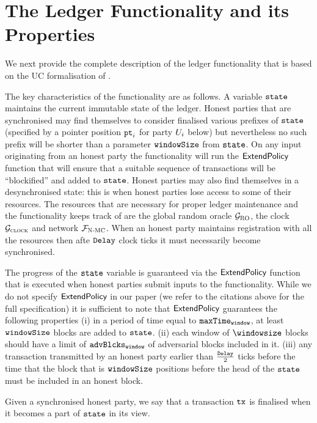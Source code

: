 




\section{The Ledger Functionality and its Properties} 
We next provide the complete description of the ledger functionality that is based on the UC formalisation of 
\cite{BMTZ17,genesis}. 

The key characteristics of the functionality are as follows. 
A variable $\texttt{state}$ maintains the current immutable state of the ledger. 
Honest parties that are synchronised may find themselves  to consider finalised 
various prefixes of $\texttt{state}$ (specified by a pointer position $\texttt{pt}_{i}$  for party
$U_i$ below) but nevertheless no such prefix will be shorter than a parameter
$\texttt{windowSize}$ from $\texttt{state}$. On any input originating from an honest party 
the functionality will run the $\textsf{ExtendPolicy}$ function that will ensure that
a suitable sequence of transactions will be ``blockified'' and added
to $\texttt{state}$. Honest parties may also find themselves in a desynchronised
state: this is when honest parties lose access to some of their resources.
The resources that are necessary for proper ledger maintenance 
and the functionality
keeps track of are the global random oracle $\mathcal{G}_{\textsc{RO}}$, the clock $\mathcal{G}_{\textsc{clock}}$
and network $\mathcal{F}_{\textsc{N-MC}}$. 
When an honest party maintains registration with all the resources
then afte $\texttt{Delay}$ clock ticks it must necessarily become synchronised. 

The progress of the $\texttt{state}$ variable is guaranteed via 
the $\textsf{ExtendPolicy}$ function that is executed when honest parties
submit inputs to the functionality. 
While we do not specify $\textsf{ExtendPolicy}$ in our paper
(we refer to the citations above for the full specification)
it is sufficient to note that $\textsf{ExtendPolicy}$ guarantees
the following properties  
(i) in a period of time equal to $\texttt{maxTime}_\texttt{window}$, 
at least $\texttt{windowSize}$ blocks are added
to  $\texttt{state}$. 
(ii) each window of $\windowsize$ blocks should have a limit of $\texttt{advBlcks}_\texttt{window}$ of adversarial blocks included in it. 
(iii) 
any transaction transmitted by an honest party earlier than
$\frac{\texttt{Delay}}{2}$ ticks before the time 
that the  block that is $\texttt{windowSize}$ positions before the head
of the $\texttt{state}$ must be included in an honest block. 

Given a synchronised honest party, we say that a transaction
$\texttt{tx}$ is finalised when it becomes a part of $\texttt{state}$ in its view. 

